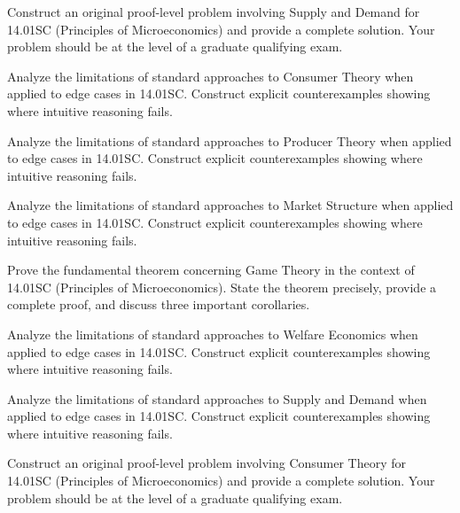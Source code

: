 \documentclass[12pt,a4paper]{exam}
\begin{document}
\begin{questions}

\question[4]
Construct an original proof-level problem involving Supply and Demand for 14.01SC (Principles of Microeconomics) and provide a complete solution. Your problem should be at the level of a graduate qualifying exam.

\vspace{0.3cm}

\question[5]
Analyze the limitations of standard approaches to Consumer Theory when applied to edge cases in 14.01SC. Construct explicit counterexamples showing where intuitive reasoning fails.

\vspace{0.3cm}

\question[5]
Analyze the limitations of standard approaches to Producer Theory when applied to edge cases in 14.01SC. Construct explicit counterexamples showing where intuitive reasoning fails.

\vspace{0.3cm}

\question[4]
Analyze the limitations of standard approaches to Market Structure when applied to edge cases in 14.01SC. Construct explicit counterexamples showing where intuitive reasoning fails.

\vspace{0.3cm}

\question[3]
Prove the fundamental theorem concerning Game Theory in the context of 14.01SC (Principles of Microeconomics). State the theorem precisely, provide a complete proof, and discuss three important corollaries.

\vspace{0.3cm}

\question[4]
Analyze the limitations of standard approaches to Welfare Economics when applied to edge cases in 14.01SC. Construct explicit counterexamples showing where intuitive reasoning fails.

\vspace{0.3cm}

\question[4]
Analyze the limitations of standard approaches to Supply and Demand when applied to edge cases in 14.01SC. Construct explicit counterexamples showing where intuitive reasoning fails.

\vspace{0.3cm}

\question[7]
Construct an original proof-level problem involving Consumer Theory for 14.01SC (Principles of Microeconomics) and provide a complete solution. Your problem should be at the level of a graduate qualifying exam.


\end{questions}
\end{document}
